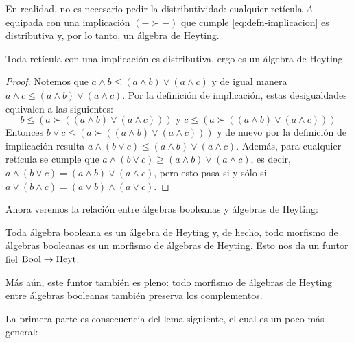 En realidad, no es necesario pedir la distributividad: cualquier
retícula $A$ equipada con una implicación $(-\succ-)$ que cumple
\eqref{eq:defn-implicacion} es distributiva y, por lo tanto, un
álgebra de Heyting.
\begin{proposition}\label{disheyt}
Toda ret\'icula con una implicación es distributiva, ergo es un álgebra de Heyting.
\end{proposition}
\begin{proof}
    Notemos que $a\wedge b \leq (a\wedge b)\vee (a\wedge c)$ y de
    igual manera $a\wedge c\leq  (a\wedge b)\vee (a\wedge c)$. Por la
    definición de implicación, estas desigualdades equivalen a las
    siguientes:
    \[b\leq (a \succ ((a \wedge b) \vee (a \wedge c))) \mbox{ y } c
    \leq (a\succ ((a \wedge b) \vee (a \wedge c)))\]
    Entonces $b \vee c \leq (a \succ ((a \wedge b) \vee (a \wedge
    c)))$ y de nuevo por la definición de implicación resulta $a
    \wedge (b \vee c)\leq (a\wedge b)\vee (a \wedge c)$. Además, para
    cualquier retícula se cumple que $a \wedge (b \vee c)\geq (a\wedge
    b)\vee (a \wedge c)$, es decir, $a \wedge (b \vee c)= (a\wedge
    b)\vee (a \wedge c)$, pero esto pasa si y sólo si $a \vee (b
    \wedge c)= (a\vee b)\wedge (a \vee c)$.
\end{proof}

Ahora veremos la relación entre álgebras booleanas y álgebras de
Heyting:
\begin{lemma}
  Toda álgebra booleana es un álgebra de Heyting y, de hecho,
  todo morfismo de álgebras booleanas es un morfismo de álgebras de
  Heyting. Esto nos da un funtor fiel $\mathrm{Bool}\to\mathrm{Heyt}$.

  Más aún, este funtor también es pleno: todo morfismo de álgebras de
  Heyting entre álgebras booleanas también preserva los complementos.
\end{lemma}

La primera parte es consecuencia del lema siguiente, el cual es un
poco más general:

